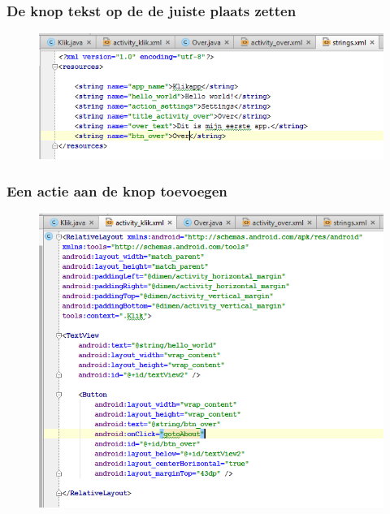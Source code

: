 \documentclass[11pt]{beamer}
\begin{document}
\begin{frame}
\frametitle{De knop tekst op de de juiste plaats zetten}
\begin{figure}
\centering
\includegraphics[width=1.0\linewidth]{./addbutton6}
\label{fig:addbutton6}
\end{figure}
\end{frame}


\begin{frame}
\frametitle{Een actie aan de knop toevoegen}
\begin{figure}
\centering
\includegraphics[height=.9\textheight]{./intent1}
\label{fig:intent1}
\end{figure}
\end{frame}
\end{document}
